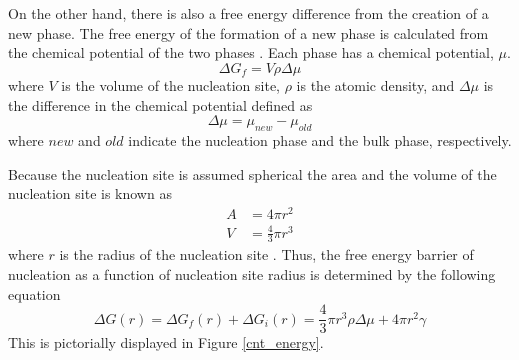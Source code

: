 On the other hand, there is also a free energy difference from the creation of a new phase.  The free energy of the formation of a new phase is calculated from the chemical potential of the two phases \cite{mutaftschiev2001atomistic}.  Each phase has a chemical potential, $\mu$.
\begin{equation}
	\Delta G_{f} = V\rho\Delta \mu
\end{equation}
where $V$ is the volume of the nucleation site, $\rho$ is the atomic density, and $\Delta \mu$ is the difference in the chemical potential defined as
\begin{equation}
	\Delta \mu = \mu_{new} - \mu_{old}
\end{equation}
where $new$ and $old$ indicate the nucleation phase and the bulk phase, respectively.

Because the nucleation site is assumed spherical the area and the volume of the nucleation site is known as
\begin{equation}
	\begin{split}
		A &= 4\pi r^2\\
		V &= \frac{4}{3}\pi r^3 
	\end{split}
\end{equation}
where $r$ is the radius of the nucleation site \cite{mutaftschiev2001atomistic}.  Thus, the free energy barrier of nucleation as a function of nucleation site radius is determined by the following equation
\begin{equation}
	\Delta G(r) = \Delta G_{f}(r) + \Delta G_{i}(r) = \frac{4}{3}\pi r^3\rho \Delta \mu + 4\pi r^2\gamma
\end{equation}
This is pictorially displayed in Figure \ref{cnt_energy}.

